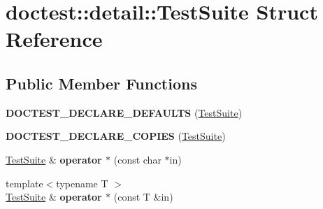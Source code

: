 \hypertarget{structdoctest_1_1detail_1_1_test_suite}{}\section{doctest\+::detail\+::Test\+Suite Struct Reference}
\label{structdoctest_1_1detail_1_1_test_suite}
\subsection*{Public Member Functions}
\begin{DoxyCompactItemize}
\item 
\mbox{\label{structdoctest_1_1detail_1_1_test_suite_ab37a6f775bf044c84f4ee17d475928b2}} 
{\bfseries D\+O\+C\+T\+E\+S\+T\+\_\+\+D\+E\+C\+L\+A\+R\+E\+\_\+\+D\+E\+F\+A\+U\+L\+TS} (\mbox{\hyperlink{structdoctest_1_1detail_1_1_test_suite}{Test\+Suite}})
\item 
\mbox{\label{structdoctest_1_1detail_1_1_test_suite_aba81ddee8aa25d8b1cf2aeda54fd0c62}} 
{\bfseries D\+O\+C\+T\+E\+S\+T\+\_\+\+D\+E\+C\+L\+A\+R\+E\+\_\+\+C\+O\+P\+I\+ES} (\mbox{\hyperlink{structdoctest_1_1detail_1_1_test_suite}{Test\+Suite}})
\item 
\mbox{\label{structdoctest_1_1detail_1_1_test_suite_a35daa88e9478e9218e7933f1840f2c45}} 
\mbox{\hyperlink{structdoctest_1_1detail_1_1_test_suite}{Test\+Suite}} \& {\bfseries operator $\ast$} (const char $\ast$in)
\item 
\mbox{\label{structdoctest_1_1detail_1_1_test_suite_a4c57c18169b4829a72d8b0ec4fd87f96}} 
{\footnotesize template$<$typename T $>$ }\\\mbox{\hyperlink{structdoctest_1_1detail_1_1_test_suite}{Test\+Suite}} \& {\bfseries operator $\ast$} (const T \&in)
\end{DoxyCompactItemize}
